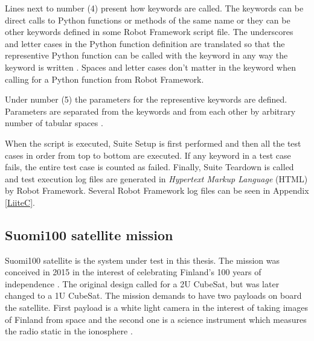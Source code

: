 \documentclass[english,12pt,a4paper,pdftex,elec,utf8]{aaltothesis}
\begin{document}
Lines next to number (4) present how keywords are called. The keywords can be direct calls to Python functions or methods of the same name or they can be other keywords defined in some Robot Framework script file. The underscores and letter cases in the Python function definition are translated so that the representive Python function can be called with the keyword in any way the keyword is written \cite{robotuserguide}. Spaces and letter cases don't matter in the keyword when calling for a Python function from Robot Framework.\par 
Under number (5) the parameters for the representive keywords are defined. Parameters are separated from the keywords and from each other by arbitrary number of tabular spaces \cite{robotuserguide}.\par
When the script is executed, Suite Setup is first performed and then all the test cases in order from top to bottom are executed. If any keyword in a test case fails, the entire test case is counted as failed. Finally, Suite Teardown is called and test execution log files are generated in \textit{Hypertext Markup Language} (HTML) by Robot Framework. Several Robot Framework log files can be seen in Appendix \ref{LiiteC}. \cite{robotuserguide}
\subsection{Suomi100 satellite mission}
Suomi100 satellite is the system under test in this thesis. The mission was conceived in 2015 in the interest of celebrating Finland's 100 years of independence \cite{s1002015}. The original design called for a 2U CubeSat, but was later changed to a 1U CubeSat. The mission demands to have two payloads on board the satellite. First payload is a white light camera in the interest of taking images of Finland from space and the second one is a science instrument which measures the radio static in the ionosphere \cite{s100blogi, s1002015}.\par
\end{document}
